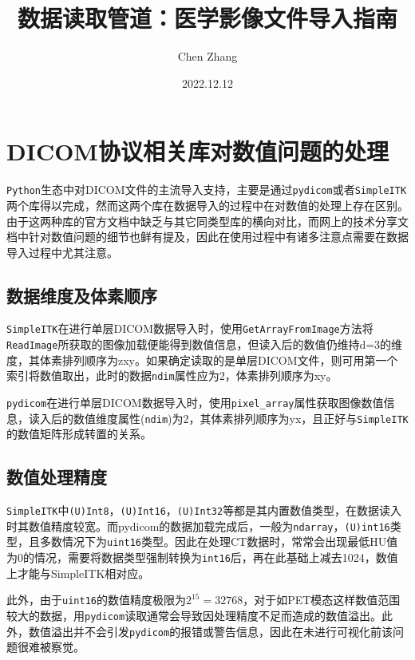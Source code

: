 \documentclass{ctexart}
\title{数据读取管道：医学影像文件导入指南}
\author{Chen Zhang}
\date{2022.12.12}
\begin{document}
\maketitle

\section{DICOM协议相关库对数值问题的处理}

\verb|Python|生态中对DICOM文件的主流导入支持，主要是通过\verb|pydicom|或者\verb|SimpleITK|两个库得以完成，然而这两个库在数据导入的过程中在对数值的处理上存在区别。由于这两种库的官方文档中缺乏与其它同类型库的横向对比，而网上的技术分享文档中针对数值问题的细节也鲜有提及，因此在使用过程中有诸多注意点需要在数据导入过程中尤其注意。\par

\subsection{数据维度及体素顺序}

\verb|SimpleITK|在进行单层DICOM数据导入时，使用\verb|GetArrayFromImage|方法将\verb|ReadImage|所获取的图像加载便能得到数值信息，但读入后的数值仍维持d=3的维度，其体素排列顺序为zxy。如果确定读取的是单层DICOM文件，则可用第一个索引将数值取出，此时的数据\verb|ndim|属性应为2，体素排列顺序为xy。\par

\verb|pydicom|在进行单层DICOM数据导入时，使用\verb|pixel_array|属性获取图像数值信息，读入后的数值维度属性(\verb|ndim|)为2，其体素排列顺序为yx，且正好与\verb|SimpleITK|的数值矩阵形成转置的关系。\par

\subsection{数值处理精度}

\verb|SimpleITK|中\verb|(U)Int8|，\verb|(U)Int16|，\verb|(U)Int32|等都是其内置数值类型，在数据读入时其数值精度较宽。而pydicom的数据加载完成后，一般为\verb|ndarray|，\verb|(U)int16|类型，且多数情况下为\verb|uint16|类型。因此在处理CT数据时，常常会出现最低HU值为0的情况，需要将数据类型强制转换为\verb|int16|后，再在此基础上减去1024，数值上才能与SimpleITK相对应。\par

此外，由于\verb|uint16|的数值精度极限为$2^{15} = 32768$，对于如PET模态这样数值范围较大的数据，用\verb|pydicom|读取通常会导致因处理精度不足而造成的数值溢出。此外，数值溢出并不会引发\verb|pydicom|的报错或警告信息，因此在未进行可视化前该问题很难被察觉。\par
\end{document}
